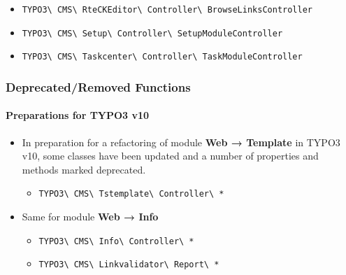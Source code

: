\begin{frame}[fragile]
\begin{itemize}
\begin{itemize}
				\item \texttt{TYPO3\textbackslash
						CMS\textbackslash
						RteCKEditor\textbackslash
						Controller\textbackslash
						BrowseLinksController}

				\item \texttt{TYPO3\textbackslash
						CMS\textbackslash
						Setup\textbackslash
						Controller\textbackslash
						SetupModuleController}

				\item \texttt{TYPO3\textbackslash
						CMS\textbackslash
						Taskcenter\textbackslash
						Controller\textbackslash
						TaskModuleController}

			\end{itemize}

	\end{itemize}

\end{frame}


\begin{frame}[fragile]
	\frametitle{Deprecated/Removed Functions}
	\framesubtitle{Preparations for TYPO3 v10}

	\begin{itemize}
		\item In preparation for a refactoring of module \textbf{Web → Template}
		 	in TYPO3 v10, some classes have been updated and a number of
			properties and methods marked deprecated.

			\begin{itemize}
				\small
				\item \texttt{TYPO3\textbackslash
					CMS\textbackslash
					Tstemplate\textbackslash
					Controller\textbackslash
					*}
			\end{itemize}

		\item Same for module \textbf{Web → Info}

			\begin{itemize}
				\small
				\item \texttt{TYPO3\textbackslash
					CMS\textbackslash
					Info\textbackslash
					Controller\textbackslash
					*}
				\item \texttt{TYPO3\textbackslash
					CMS\textbackslash
					Linkvalidator\textbackslash
					Report\textbackslash
					*}
			\end{itemize}

	\end{itemize}

\end{frame}

